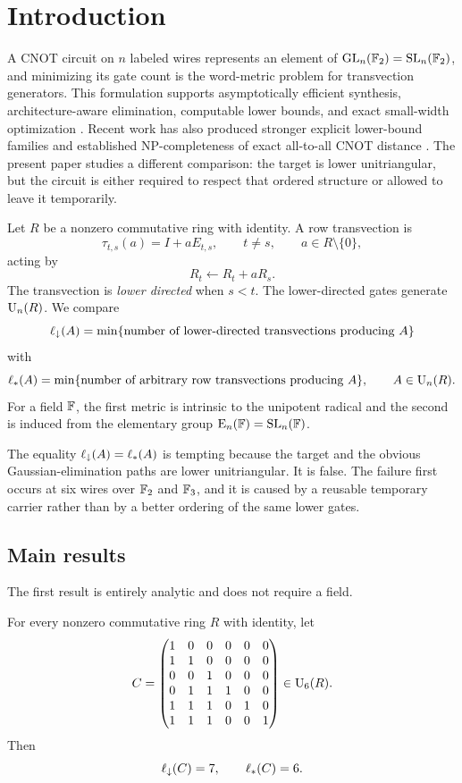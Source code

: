 \section{Introduction}

A CNOT circuit on $n$ labeled wires represents an element of $\operatorname{GL}_n(\mathbb F_2)=\operatorname{SL}_n(\mathbb F_2)$, and minimizing its gate count is the word-metric problem for transvection generators.  This formulation supports asymptotically efficient synthesis, architecture-aware elimination, computable lower bounds, and exact small-width optimization \cite{SaeediMarkov2013,PatelMarkovHayes2008,JiangEtAl2020,GoubaultEtAl2021,Bataille2022,BuFanJoo2025,ChristensenEtAl2025,WebsterEtAl2025}.  Recent work has also produced stronger explicit lower-bound families and established NP-completeness of exact all-to-all CNOT distance \cite{Jorgensen2026,GongYu2026,AcuavivaEtAl2026}.  The present paper studies a different comparison: the target is lower unitriangular, but the circuit is either required to respect that ordered structure or allowed to leave it temporarily.

Let $R$ be a nonzero commutative ring with identity.  A row transvection is
\[
\tau_{t,s}(a)=I+aE_{t,s},
\qquad t\ne s,
\qquad a\in R\setminus\{0\},
\]
acting by
\[
R_t\longleftarrow R_t+aR_s.
\]
The transvection is \emph{lower directed} when $s<t$.  The lower-directed gates generate $\operatorname{U}_n(R)$.  We compare
\[
\ell_{\downarrow}(A)
 =\min\{\text{number of lower-directed transvections producing }A\}
\]
with
\[
\ell_{*}(A)
 =\min\{\text{number of arbitrary row transvections producing }A\},
\qquad A\in\operatorname{U}_n(R).
\]
For a field $\mathbb F$, the first metric is intrinsic to the unipotent radical and the second is induced from the elementary group $\operatorname{E}_n(\mathbb F)=\operatorname{SL}_n(\mathbb F)$.

The equality $\ell_{\downarrow}(A)=\ell_{*}(A)$ is tempting because the target and the obvious Gaussian-elimination paths are lower unitriangular.  It is false.  The failure first occurs at six wires over $\mathbb F_2$ and $\mathbb F_3$, and it is caused by a reusable temporary carrier rather than by a better ordering of the same lower gates.

\subsection*{Main results}

The first result is entirely analytic and does not require a field.

\begin{theorem}\label{thm:universal-atom}
For every nonzero commutative ring $R$ with identity, let
\begin{equation}\label{eq:canonical-C}
C=
\begin{pmatrix}
1&0&0&0&0&0\\
1&1&0&0&0&0\\
0&0&1&0&0&0\\
0&1&1&1&0&0\\
1&1&1&0&1&0\\
1&1&1&0&0&1
\end{pmatrix}
\in\operatorname{U}_6(R).
\end{equation}
Then
\[
\ell_{\downarrow}(C)=7,
\qquad
\ell_{*}(C)=6.
\]
\end{theorem}

